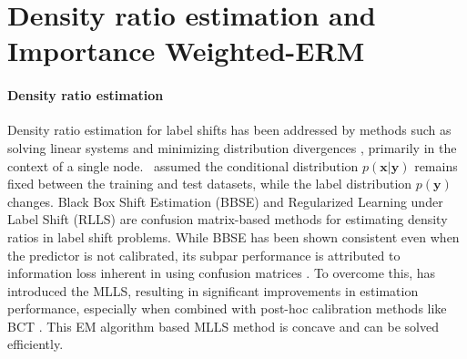 \section{Density ratio estimation and Importance Weighted-ERM \label{sec:prelim}}

\paragraph{Density ratio estimation} Density ratio estimation for label shifts has been addressed by methods such as solving linear systems \citep{bbse, rlls} and minimizing distribution divergences \citep{mlls}, primarily in the context of a single node.~\citet{bbse, rlls, mlls} assumed the conditional distribution $p(\boldsymbol{x}|\boldsymbol{y})$ remains fixed between the training and test datasets, while the label distribution $p(\boldsymbol{y})$ changes. 
Black Box Shift Estimation (BBSE) \citep{bbse, ts1} and Regularized Learning under Label Shift (RLLS) \citep{rlls} are confusion matrix-based methods for estimating density ratios in label shift problems. While BBSE has been shown consistent even when the predictor is not calibrated, its subpar performance is attributed to information loss inherent in using confusion matrices \citep{mlls}. To overcome this, \citet{mlls} has introduced the MLLS, resulting in significant improvements in estimation performance, especially when combined with post-hoc calibration methods like BCT \citep{bct}. This EM algorithm based MLLS method \citep{bbse_2002,mlls} is concave and can be solved efficiently.

